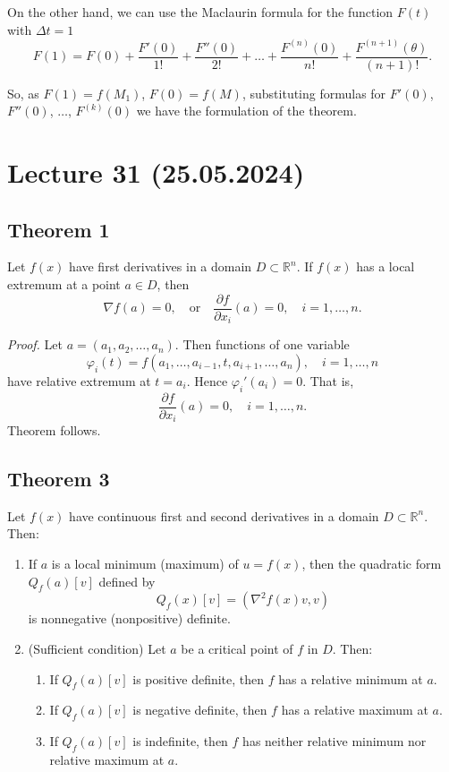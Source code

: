 \documentclass{article}
\begin{document}
On the other hand, we can use the Maclaurin formula for the function $F(t)$ with $\Delta t = 1$
\[
F(1) = F(0) + \frac{F'(0)}{1!} + \frac{F''(0)}{2!} + \dots + \frac{F^{(n)}(0)}{n!} + \frac{F^{(n+1)}(\theta)}{(n+1)!}.
\]

So, as $F(1) = f(M_1)$, $F(0) = f(M)$, substituting formulas for $F'(0)$, $F''(0)$, $\dots$, $F^{(k)}(0)$ we have the formulation of the theorem.

\section*{Lecture 31 (25.05.2024)}

\subsection*{Theorem 1}

\begin{theorem}
Let $f(x)$ have first derivatives in a domain $D \subset \mathbb{R}^n$. If $f(x)$ has a local extremum at a point $a \in D$, then
\[
\nabla f(a) = 0, \quad \text{or} \quad \frac{\partial f}{\partial x_i}(a) = 0, \quad i = 1, \ldots, n.
\]
\end{theorem}

\vspace{1em}

\textit{Proof.} Let $a = (a_1, a_2, \ldots, a_n)$. Then functions of one variable
\[
\varphi_i(t) = f(a_1, \ldots, a_{i-1}, t, a_{i+1}, \ldots, a_n), \quad i = 1, \ldots, n
\]
have relative extremum at $t = a_i$. Hence $\varphi_i'(a_i) = 0$. That is,
\[
\frac{\partial f}{\partial x_i}(a) = 0, \quad i = 1, \ldots, n.
\]
Theorem follows.

\subsection*{Theorem 3}

\begin{theorem}
Let $f(x)$ have continuous first and second derivatives in a domain $D \subset \mathbb{R}^n$. Then:
\begin{enumerate}
    \item If $a$ is a local minimum (maximum) of $u = f(x)$, then the quadratic form $Q_f(a)[v]$ defined by
    \[
    Q_f(x)[v] = \left( \nabla^2 f(x)v, v \right)
    \]
    is nonnegative (nonpositive) definite.
    \item (Sufficient condition) Let $a$ be a critical point of $f$ in $D$. Then:
    \begin{enumerate}
        \item If $Q_f(a)[v]$ is positive definite, then $f$ has a relative minimum at $a$.
        \item If $Q_f(a)[v]$ is negative definite, then $f$ has a relative maximum at $a$.
        \item If $Q_f(a)[v]$ is indefinite, then $f$ has neither relative minimum nor relative maximum at $a$.
    \end{enumerate}
\end{enumerate}
\end{theorem}
\end{document}
